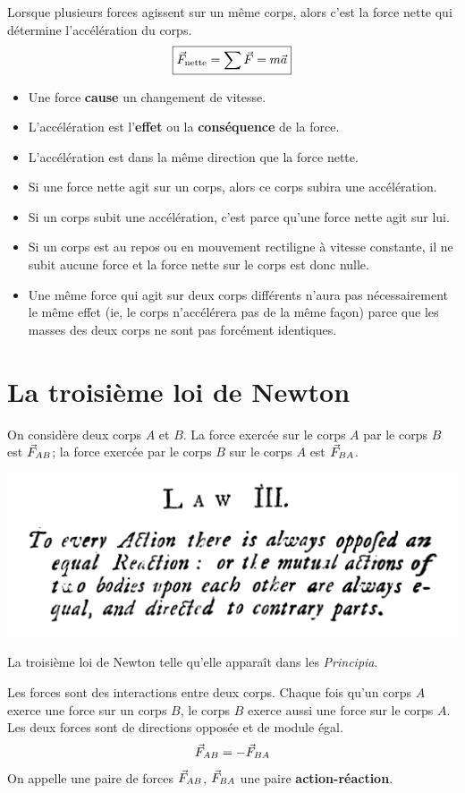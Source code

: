 Lorsque plusieurs forces agissent sur un même corps, alors c'est la force nette
qui détermine l'accélération du corps.
\[
  \boxed{\vec{F}_\mathrm{nette} = \sum \vec{F} = m\vec{a}}
\]

\begin{itemize}
  \item Une force \textbf{cause} un changement de vitesse.
  \item L'accélération est l'\textbf{effet} ou la \textbf{conséquence} de la force.
  \item L'accélération est dans la même direction que la force nette.
  \item Si une force nette agit sur un corps, alors ce corps subira une accélération.
  \item Si un corps subit une accélération, c'est parce qu'une force nette agit sur lui.
  \item Si un corps est au repos ou en mouvement rectiligne à vitesse
    constante, il ne subit aucune force et la force nette sur le corps est donc
    nulle.
  \item Une même force qui agit sur deux corps différents n'aura pas
    nécessairement le même effet (ie, le corps n'accélérera pas de la même
    façon) parce que les masses des deux corps ne sont pas forcément
    identiques.
\end{itemize}


\section{La troisième loi de Newton}

On considère deux corps $A$ et $B$.  La force exercée sur le corps $A$ par le
corps $B$ est $\vec{F}_{AB}$; la force exercée par le corps $B$ sur le corps $A$
est $\vec{F}_{BA}$.

\begin{marginfigure}
  \begin{center}
    \includegraphics[scale=0.38]{./04_Dynamique/newton3rdlaw.png}
  \end{center}
  \caption{La troisième loi de Newton telle qu'elle apparaît dans les
    \textit{Principia}.}
  \label{fig:firstlaw}
\end{marginfigure}
Les forces sont des interactions entre deux corps.  Chaque fois qu'un corps $A$
exerce une force sur un corps $B$, le corps $B$ exerce aussi une force sur le
corps $A$.  Les deux forces sont de directions opposée et de module égal.
\[
  \vec{F}_{AB} = -\vec{F}_{BA}
\]
On appelle une paire de forces $\vec{F}_{AB}$, $\vec{F}_{BA}$ une paire
\textbf{action-réaction}.


